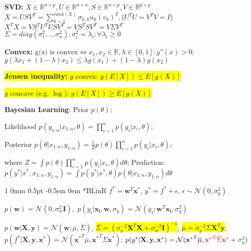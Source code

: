 \documentclass[11pt,landscape,a4paper,fleqn]{article}
\makeatletter
\newcommand*{\rsection}{%
	\@startsection{section}%
	{1}%
	{0mm}%
	{0.5pt}%
	{-0.5em \@plus 0em}
	{\color{myorange}\sffamily\small\bfseries}}
\newcommand{\mhl}[1]{\setlength{\fboxsep}{0pt}\colorbox{yellow}{#1}}
\makeatother
\begin{document}
\begin{multicols*}{4}
\textbf{SVD:}
$X\in \mathbb{R}^{n\times p}, U\in \mathbb{R}^{n\times n}, S\in \mathbb{R}^{n\times p},
V\in \mathbb{R}^{p\times p}$\\
$X=USV^T=\sum_{k=1}^{rank(X)}\sigma_{k,k}u_k (v_k)^T,\!${\tiny{($U^TU=V^TV=I$)}}\\
$X^TX=VS^TU^TUSV^T=VS^TSV^T=V\Sigma V^T$\\
$\Sigma = diag(\sigma_1^2,..,\sigma_n^2);\sigma_i^2=\lambda_i; \forall \lambda_i \geq 0$
\fi




\textbf{Convex:}
$\text{g(x) is convex} \Leftrightarrow x_1,x_2 \in \mathbb{R}, \lambda \in [0,1]: g\text{''}(x) > 0$;
$g(\lambda x_1 + (1-\lambda) x_2) \leq \lambda g(x_1) + (1-\lambda) g(x_2)$

\mhl{\textbf{Jensen inequality: }$g$ convex: $g(E[X]) \leq E[g(X)]$}

\mhl{$g$ concave (e.g. $\log$): $g(E[X]) \geq E[g(X)]$}

\textbf{Bayesian Learning}:
Prior $p(\theta)$;

Likelihood $p(y_{1:n} | x_{1:n}, \theta) = \prod_{i=1}^{n} p(y_i | x_i, \theta)$;

Posterior $p(\theta | x_{1:n}, y_{1:n}) = \frac{1}{Z} p(\theta) \prod_{i=1}^{n} p(y_i | x_i, \theta)$;

where $Z = \int p(\theta) \prod_{i=1}^{n} p(y_i | x_i, \theta) d\theta$;
Prediction: $p(y^* | x^*, x_{1:n}, y_{1:n}) = \int p(y^* | x^*, \theta) p(\theta | x_{1:n}, y_{1:n}) d\theta$

\rsection*{BLinR} $f^* = \mathbf{w}^T\mathbf{x}^*$, $y^* = f^* + \epsilon$, $\epsilon \sim \mathcal{N}(0, \sigma_y^2)$

\vspace*{-0.5mm}
\mbox{\fontsize{9.8}{6}\selectfont $p(\mathbf{w}) = \mathcal{N}(0, \sigma_w^2 \mathbf{I})$, $p(y_i|\mathbf{x_i}, \mathbf{w}, \sigma_y) = \mathcal{N}(y_i; \mathbf{w}^T\mathbf{x_i}, \sigma_y^2)$}

\vspace*{-0.5mm}
$p(\mathbf{w} | \mathbf{X, y}) = \mathcal{N}(\mathbf{w}; \overline{\mu}, \overline{\Sigma})$,
\mhl{$\overline{\Sigma} = (\sigma_y^{-2}\mathbf{X}^T\mathbf{X} + \sigma_w^{-2} \mathbf{I})^{-1}$},
\mhl{$\overline{\mu} = \sigma_y^{-2} \overline{\Sigma} \mathbf{X}^T\mathbf{y}$};
$p(f^* | \mathbf{X,y,x^*}) = \mathcal{N}(\mathbf{x^*}^T\overline{\mu}, {\mathbf{x}^*}^T \overline{\Sigma} \mathbf{x}^*)$;
$p(y^* | \mathbf{X,y,x^*}) = \mathcal{N}({\mathbf{x}^*}^T \overline{\mu}, \textcolor{red}{{\mathbf{x}^*}^T \overline{\Sigma} \mathbf{x}^*} + \textcolor{darkgreen}{\sigma_y^2})$


\end{multicols*}
\end{document}
